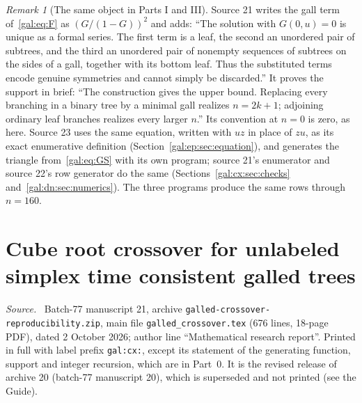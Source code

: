 \documentclass[11pt,letterpaper]{article}
\numberwithin{equation}{section}
\theoremstyle{definition}\newtheorem{definition}[theorem]{Definition}
\theoremstyle{remark}\newtheorem{remark}[theorem]{Remark}
\newenvironment{partsource}{\par\medskip\noindent\begin{minipage}{\linewidth}\small\raggedright\textit{Source.}\ }{\end{minipage}\par\medskip}
\begin{document}
\begin{remark}[The same object in Parts I and III]\label{gal:rem:part1model}
Source 21 writes the gall term of~\eqref{gal:eq:F} as $(G/(1-G))^2$ and adds: ``The solution with $G(0,u)=0$ is unique as a formal series. The first term is a leaf, the second an unordered pair of subtrees, and the third an unordered pair of nonempty sequences of subtrees on the sides of a gall, together with its bottom leaf. Thus the substituted terms encode genuine symmetries and cannot simply be discarded.'' It proves the support in brief: ``The construction gives the upper bound. Replacing every branching in a binary tree by a minimal gall realizes $n=2k+1$; adjoining ordinary leaf branches realizes every larger $n$.'' Its convention at $n=0$ is zero, as here. Source 23 uses the same equation, written with $uz$ in place of $zu$, as its exact enumerative definition (Section~\ref{gal:ep:sec:equation}), and generates the triangle from~\eqref{gal:eq:GS} with its own program; source 21's enumerator and source 22's row generator do the same (Sections~\ref{gal:cx:sec:checks} and~\ref{gal:dn:sec:numerics}). The three programs produce the same rows through $n=160$.
\end{remark}

\part{Cube root crossover for unlabeled simplex time consistent galled trees}\label{gal:part:cx}

\begin{partsource}
Batch-77 manuscript 21, archive \texttt{galled-crossover-reproducibility.zip}, main file \texttt{galled\_crossover.tex} (676 lines, 18-page PDF), dated 2 October 2026; author line ``Mathematical research report''. Printed in full with label prefix \texttt{gal:cx:}, except its statement of the generating function, support and integer recursion, which are in Part~0. It is the revised release of archive 20 (batch-77 manuscript 20), which is superseded and not printed (see the Guide).
\end{partsource}
\end{document}
